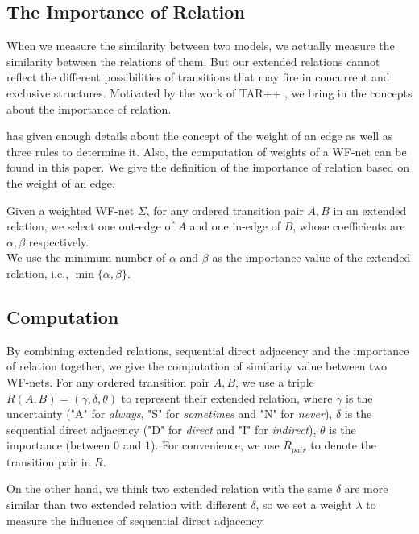 \documentclass{llncs}
\begin{document}
\subsection{The Importance of Relation}\label{subsec:importance}
When we measure the similarity between two models, we actually measure the similarity between the relations of them. But our extended relations cannot reflect the different possibilities of transitions that may fire in concurrent and exclusive structures. Motivated by the work of TAR++ \cite{wang2015tar++}, we bring in the concepts about the importance of relation.

\cite{wang2015tar++} has given enough details about the concept of the weight of an edge as well as three rules to determine it. Also, the computation of weights of a WF-net can be found in this paper. We give the definition of the importance of relation based on the weight of an edge.

\begin{definition}\label{def:importance}
Given a weighted WF-net $\Sigma$, for any ordered transition pair $A,B$ in an extended relation, we select one out-edge of $A$ and one in-edge of $B$, whose coefficients are $\alpha,\beta$ respectively.\\
We use the minimum number of $\alpha$ and $\beta$ as the importance value of the extended relation, i.e., $\min\{\alpha,\beta\}$.
\end{definition}

\subsection{Computation}\label{subsec:computation}
By combining extended relations, sequential direct adjacency and the importance of relation together, we give the computation of similarity value between two WF-nets. For any ordered transition pair $A,B$, we use a triple $R(A,B)=(\gamma,\delta,\theta)$ to represent their extended relation, where $\gamma$ is the uncertainty ("A" for \textit{always}, "S" for \textit{sometimes} and "N" for \textit{never}), $\delta$ is the sequential direct adjacency ("D" for \textit{direct} and "I" for \textit{indirect}), $\theta$ is the importance (between $0$ and $1$). For convenience, we use $R_{pair}$ to denote the transition pair in $R$.

On the other hand, we think two extended relation with the same $\delta$ are more similar than two extended relation with different $\delta$, so we set a weight $\lambda$ to measure the influence of sequential direct adjacency.
\end{document}
